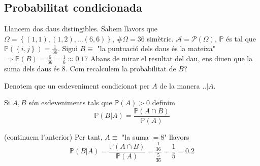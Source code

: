 \documentclass[../main.tex]{subfiles}
\begin{document}
    \subsection{Probabilitat condicionada}
    \begin{exemple}
        Llancem dos daus distingibles. Sabem llavors que $\Omega = \left\{ \left(1,1\right),  \left(1,2\right), \dots  \left(6,6\right) \right\}$,
        $\#\Omega = 36$ simètric. $\mathcal{A} = \mathcal{P}\left(\Omega\right)$, $\mathbb{P}$ és
        tal que $\mathbb{P}\left(\left\{i,j\right\} \right) = \frac{1}{36}$. Sigui $B \equiv $ "la
        puntuació dels daus és la mateixa" $\Rightarrow \mathbb{P}\left(B\right) = \frac{6}{36} = \frac{1}{6} \approx 0.17$
        Abans de mirar el resultat del dau, ens diuen que la suma dels daus és $8$. Com recalculem
        la probabilitat de $B$?
    \end{exemple}
    \begin{notacio}
        Denotem que un esdeveniment condicionat per $A$ de la manera $..|A$.
    \end{notacio}
    \begin{definicio}
        Si $A, B$ són esdeveniments tals que $\mathbb{P}\left(A\right)>0$ definim
        \begin{displaymath}
            \mathbb{P}\left(B|A\right) = \frac{\mathbb{P}\left(A\cap B\right)}{\mathbb{P}\left(A\right)}
        \end{displaymath}
    \end{definicio}
    \begin{exemple}(continuem l'anterior)
        Per tant, $A \equiv$ "la suma $=8$" llavors
        \begin{displaymath}
            \mathbb{P}\left(B|A\right) = \frac{\mathbb{P}\left(A\cap B\right)}{\mathbb{P}\left(A\right)} = \frac{\frac{1}{36}}{\frac{5}{36}} = \frac{1}{5} = 0.2 
        \end{displaymath}
    \end{exemple}
\end{document}
